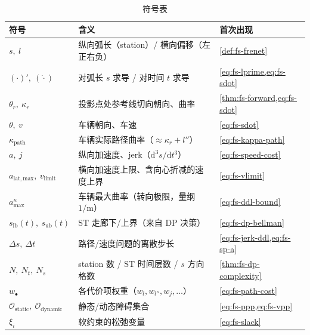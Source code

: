\begin{table}[H]\centering\small
\caption{符号表}
\label{tab:fs-symbols}
\begin{tabular}{lll}
\toprule
符号 & 含义 & 首次出现 \\
\midrule
$s,\ l$ & 纵向弧长（station）/ 横向偏移（左正右负） & \cref{def:fs-frenet} \\
$(\cdot)',\ (\dot{\cdot})$ & 对弧长 $s$ 求导 / 对时间 $t$ 求导 & \cref{eq:fs-lprime,eq:fs-sdot} \\
$\theta_r,\ \kappa_r$ & 投影点处参考线切向朝向、曲率 & \cref{thm:fs-forward,eq:fs-sdot} \\
$\theta,\ v$ & 车辆朝向、车速 & \cref{eq:fs-sdot} \\
$\kappa_{\mathrm{path}}$ & 车辆实际路径曲率（$\approx\kappa_r+l''$） & \cref{eq:fs-kappa-path} \\
$a,\ j$ & 纵向加速度、jerk（$\mathrm{d}^3s/\mathrm{d}t^3$） & \cref{eq:fs-speed-cost} \\
$a_{\mathrm{lat,max}},\ v_{\mathrm{limit}}$ & 横向加速度上限、含向心折减的速度上界 & \cref{eq:fs-vlimit} \\
$a^\kappa_{\max}$ & 车辆最大曲率（转向极限，量纲 $1/\mathrm{m}$） & \cref{eq:fs-ddl-bound} \\
$s_{\mathrm{lb}}(t),\ s_{\mathrm{ub}}(t)$ & ST 走廊下/上界（来自 DP 决策） & \cref{eq:fs-dp-bellman} \\
$\Delta s,\ \Delta t$ & 路径/速度问题的离散步长 & \cref{eq:fs-jerk-ddl,eq:fs-sp-a} \\
$N,\ N_t,\ N_s$ & station 数 / ST 时间层数 / $s$ 方向格数 & \cref{thm:fs-dp-complexity} \\
$w_\bullet$ & 各代价项权重（$w_l,w_{l''},w_j,\dots$） & \cref{eq:fs-path-cost} \\
$\mathcal{O}_{\mathrm{static}},\ \mathcal{O}_{\mathrm{dynamic}}$ & 静态/动态障碍集合 & \cref{eq:fs-ppp,eq:fs-vpp} \\
$\xi_i$ & 软约束的松弛变量 & \cref{eq:fs-slack} \\
\bottomrule
\end{tabular}
\end{table}

